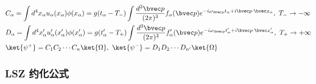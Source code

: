 \begin{equation}\begin{aligned}
&C_\alpha=\int d^4 {x_\alpha} u_\alpha(x_\alpha)\phi(x_\alpha)=g(t_\alpha-T_-)\int \frac{d^3 {\bvec p}}{(2\pi)^3} f_\alpha(\bvec p)e^{-i\omega_{\bvec p}t_\alpha+i\bvec p\cdot \bvec x_\alpha},\ T_-\rightarrow -\infty\\
&D_\alpha=\int d^4 {x'_\alpha} u'_\alpha(x'_\alpha)\phi(x'_\alpha)=g(t'_\alpha-T_+)\int \frac{d^3 {\bvec p}}{(2\pi)^3} f'_\alpha(\bvec p)e^{-i\omega_{\bvec p}t'_\alpha+i\bvec p\cdot \bvec x'_\alpha},\ T_+\rightarrow +\infty\\
&\ket{\psi^+}=C_1C_2\cdots C_n\ket{\Omega},\ \ket{\psi^-}=D_1D_2\cdots D_{n'}\ket{\Omega}\\
\end{aligned}\end{equation}
\subsubsection{LSZ 约化公式}

